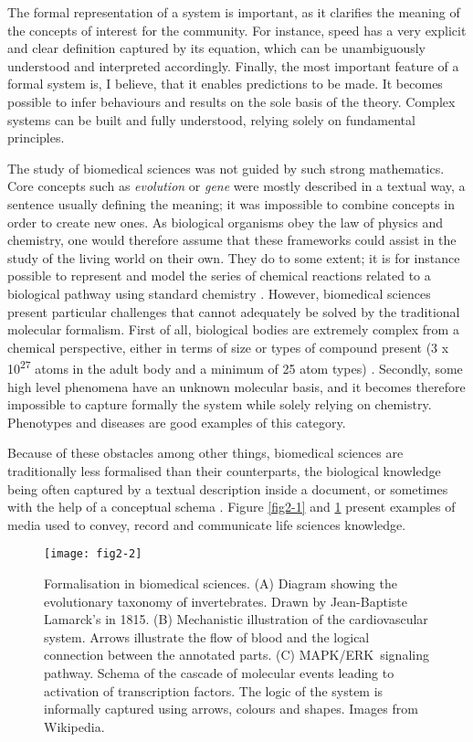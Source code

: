 The formal representation of a system is important, as it clarifies the meaning of the concepts of interest for the community. For instance, speed has a very explicit and clear definition captured by its equation, which can be unambiguously understood and interpreted accordingly. Finally, the most important feature of a formal system is, I believe, that it enables predictions to be made. It becomes possible to infer behaviours and results on the sole basis of the theory. Complex systems can be built and fully understood, relying solely on fundamental principles.

The study of biomedical sciences was not guided by such strong mathematics. Core concepts such as \emph{evolution} or \emph{gene} were mostly described in a textual way, a sentence usually defining the meaning; it was impossible to combine concepts in order to create new ones. As biological organisms obey the law of physics and chemistry, one would therefore assume that these frameworks could assist in the study of the living world on their own. They do to some extent; it is for instance possible to represent and model the series of chemical reactions related to a biological pathway using standard chemistry \citep{le2006biomodels}. However, biomedical sciences present particular challenges that cannot adequately be solved by the traditional molecular formalism. First of all, biological bodies are extremely complex from a chemical perspective, either in terms of size or types of compound present (3 x 10\textsuperscript{27} atoms in the adult body and a minimum of 25 atom types) \citep{nielsen1999ultratrace}. Secondly, some high level phenomena have an unknown molecular basis, and it becomes therefore impossible to capture formally the system while solely relying on chemistry. Phenotypes and diseases are good examples of this category.

Because of these obstacles among other things, biomedical sciences are traditionally less formalised than their counterparts, the biological knowledge being often captured by a textual description inside a document, or sometimes with the help of a conceptual schema \citep{lazebnik2002can}. Figure \ref{fig2-1} and \ref{fig2-2} present examples of media used to convey, record and communicate life sciences knowledge.

\begin{figure}[ht]
    \centering
    \texttt{[image: fig2-2]}
    \caption{Formalisation in biomedical sciences. (A) Diagram showing the evolutionary taxonomy of invertebrates. Drawn by Jean-Baptiste Lamarck's in 1815. (B) Mechanistic illustration of the cardiovascular system. Arrows illustrate the flow of blood and the logical connection between the annotated parts. (C) MAPK/ERK signaling pathway. Schema of the cascade of molecular events leading to activation of transcription factors. The logic of the system is informally captured using arrows, colours and shapes. Images from Wikipedia.}
    \label{fig2-2}
\end{figure}

